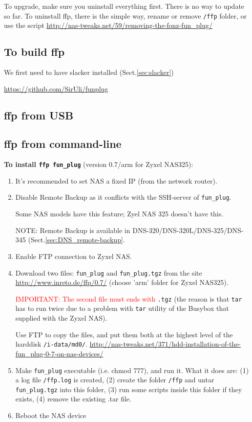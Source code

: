 To upgrade, make sure you uninstall everything first. There is no way to update
so far. To uninstall ffp, there is the simple way, rename or remove \verb!/ffp!
folder, or use the script
\url{http://nas-tweaks.net/59/removing-the-fonz-fun_plug/}

\subsection{To build ffp}

We first need to have slacker installed (Sect.\ref{sec:slacker})

\url{https://github.com/SirUli/funplug}


\subsection{ffp from USB}

\subsection{ffp from command-line}
\label{sec:ffp_install-via-command_line}

{\bf To install \verb!ffp fun_plug!} (version 0.7/arm for Zyxel NAS325): 
\begin{enumerate}
  \item It's recommended to set NAS a fixed IP (from the network router).
  
  \item Disable Remote Backup as it conflicts with the SSH-server of
  \verb!fun_plug!.
  
Some NAS models have this feature; Zyel NAS 325 doesn't have this. 
    
NOTE: Remote Backup is available in DNS-320/DNS-320L/DNS-325/DNS-345
(Sect.\ref{sec:DNS_remote-backup}.
  
  \item Enable FTP connection to Zyxel NAS.
  
  \item Download two files: \verb!fun_plug! and \verb!fun_plug.tgz! from the
  site
  \url{http://www.inreto.de/ffp/0.7/} (choose 'arm' folder for Zyxel NAS325).
  
  \textcolor{red}{IMPORTANT: The second file must ends with} \verb!.tgz! (the
  reason is that \verb!tar! has to run twice due to a problem with \verb!tar!
  utility of the Busybox that supplied with the Zyxel NAS).   
  
  Use FTP to copy the files, and put them both at the highest level of the
  harddisk \verb!/i-data/md0/!.
  \url{http://nas-tweaks.net/371/hdd-installation-of-the-fun_plug-0-7-on-nas-devices/}
  
  \item  Make \verb!fun_plug! executable (i.e. chmod 777), and run it. What it does are:
(1) a log file \verb!/ffp.log! is created, (2) create the folder \verb!/ffp! and untar
\verb!fun_plug.tgz! into this folder, (3) run some scripts inside this folder
if they exists, (4) remove the existing .tar file.
  
  \item Reboot the NAS device
  
\end{enumerate}


